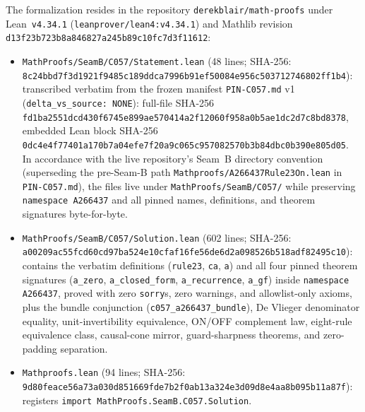 \documentclass[11pt]{article}
\theoremstyle{definition}
\begin{document}
The formalization resides in the repository \texttt{derekblair/math-proofs} under Lean~\texttt{v4.34.1} (\nolinkurl{leanprover/lean4:v4.34.1}) and Mathlib revision {\small\nolinkurl{d13f23b723b8a846827a245b89c10fc7d3f11612}}:
\begin{itemize}
\item \nolinkurl{MathProofs/SeamB/C057/Statement.lean} (48 lines; SHA-256:\\
{\small\nolinkurl{8c24bbd7f3d1921f9485c189ddca7996b91ef50084e956c503712746802ff1b4}}):\\
transcribed verbatim from the frozen manifest \texttt{PIN-C057.md} v1 (\texttt{delta\_vs\_source: NONE}): full-file SHA-256\\
{\small\nolinkurl{fd1ba2551dcd430f6745e899ae570414a2f12060f958a0b5ae1dc2d7c8bd8378}},\\
embedded Lean block SHA-256\\
{\small\nolinkurl{0dc4e4f77401a170b7a04efe7f20a9c065c957082570b3b84dbc0b390e805d05}}.\\
In accordance with the live repository's Seam~B directory convention (superseding the pre-Seam-B path \nolinkurl{Mathproofs/A266437Rule23On.lean} in \texttt{PIN-C057.md}), the files live under \nolinkurl{MathProofs/SeamB/C057/} while preserving \texttt{namespace A266437} and all pinned names, definitions, and theorem signatures byte-for-byte.
\item \nolinkurl{MathProofs/SeamB/C057/Solution.lean} (602 lines; SHA-256:\\
{\small\nolinkurl{a00209ac55fcd60cd97ba524e10cfaf16fe56de6d2a098526b518adf82495c10}}):\\
contains the verbatim definitions (\texttt{rule23}, \texttt{ca}, \texttt{a}) and all four pinned theorem signatures (\texttt{a\_zero}, \texttt{a\_closed\_form}, \texttt{a\_recurrence}, \texttt{a\_gf}) inside \texttt{namespace A266437}, proved with zero \texttt{sorry}s, zero warnings, and allowlist-only axioms, plus the bundle conjunction (\texttt{c057\_a266437\_bundle}), De Vlieger denominator equality, unit-invertibility equivalence, ON/OFF complement law, eight-rule equivalence class, causal-cone mirror, guard-sharpness theorems, and zero-padding separation.
\item \nolinkurl{Mathproofs.lean} (94 lines; SHA-256:\\
{\small\nolinkurl{9d80feace56a73a030d851669fde7b2f0ab13a324e3d09d8e4aa8b095b11a87f}}):\\
registers \texttt{import MathProofs.SeamB.C057.Solution}.
\end{itemize}
\end{document}
